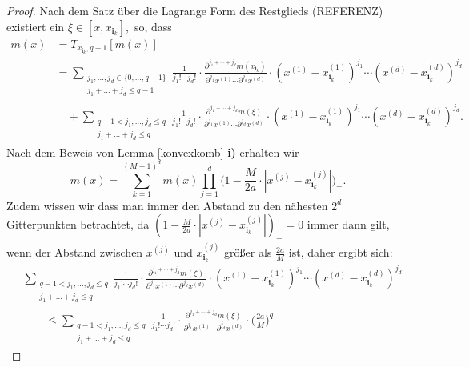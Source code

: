 \begin{proof}
Nach dem Satz über die Lagrange Form des Restglieds (REFERENZ) existiert ein $\xi \in [x, x_{\mathbf{i}_k}],$ so, dass 
\begin{equation*}
\begin{split}
m(x) & = T_{x_{\mathbf{i}_k},q - 1}[m(x)] \\
& = \sum_{\substack{j_1,\dots,j_d \in \{0,\dots,q - 1\} \\j_1+\dots +j_d \leq q - 1}} \frac{1}{j_1! \cdots j_d!} \cdot \frac{\partial^{j_1+\cdots + j_d} m(x_{\mathbf{i}_k})}{\partial^{j_1} x^{(1)}\cdots \partial^{j_d} x^{(d)}} \cdot (x^{(1)} - x_{\mathbf{i}_k}^{(1)})^{j_1} \cdots (x^{(d)} - x_{\mathbf{i}_k}^{(d)})^{j_d} \\
 & \quad + \sum_{\substack{q - 1 < j_1,\dots,j_d \leq q \\j_1+\dots +j_d \leq q}} \frac{1}{j_1! \cdots j_d!} \cdot \frac{\partial^{j_1+\cdots + j_d} m(\xi)}{\partial^{j_1} x^{(1)}\cdots \partial^{j_d} x^{(d)}}\cdot (x^{(1)} - x_{\mathbf{i}_k}^{(1)})^{j_1} \cdots (x^{(d)} - x_{\mathbf{i}_k}^{(d)})^{j_d}.
\end{split}
\end{equation*}
Nach dem Beweis von Lemma \ref{konvexkomb} \textbf{i)} erhalten wir 
$$m(x) = \sum_{k = 1}^{(M + 1)^d} m(x) \prod_{j = 1}^d \bigg(1 - \frac{M}{2a} \cdot |x^{(j)} - x_{\mathbf{i}_k}^{(j)}|\bigg)_+.$$ Zudem wissen wir dass man immer den Abstand zu den nähesten $2^d$ Gitterpunkten betrachtet, da  $(1 - \frac{M}{2a} \cdot |x^{(j)} - x_{\mathbf{i}_k}^{(j)}|)_+ = 0$ immer dann gilt, wenn der Abstand zwischen $x^{(j)}$ und $x_{\mathbf{i}_k}^{(j)}$ größer als $\frac{2a}{M}$ ist, daher ergibt sich$\colon$
\begin{equation*}
\begin{split}
& \sum_{\substack{q - 1 < j_1,\dots,j_d \leq q \\j_1+\dots +j_d \leq q}} \frac{1}{j_1! \cdots j_d!} \cdot \frac{\partial^{j_1+\cdots + j_d} m(\xi)}{\partial^{j_1} x^{(1)}\cdots \partial^{j_d} x^{(d)}}\cdot (x^{(1)} - x_{\mathbf{i}_k}^{(1)})^{j_1} \cdots (x^{(d)} - x_{\mathbf{i}_k}^{(d)})^{j_d} \\
& \qquad \leq \sum_{\substack{q - 1 < j_1,\dots,j_d \leq q \\j_1+\dots +j_d \leq q}} \frac{1}{j_1! \cdots j_d!} \cdot \frac{\partial^{j_1+\cdots + j_d} m(\xi)}{\partial^{j_1} x^{(1)}\cdots \partial^{j_d} x^{(d)}}\cdot \bigg(\frac{2a}{M}\bigg)^q
\end{split}
\end{equation*} 

\end{proof}
